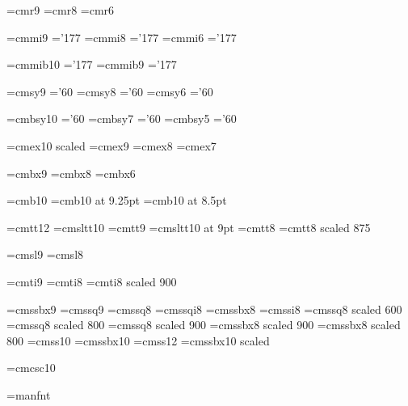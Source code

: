 \magnification\magstephalf
\parskip3pt
\baselineskip14pt

\font\ninerm=cmr9
\font\eightrm=cmr8
\font\sixrm=cmr6

\font\ninei=cmmi9  \skewchar\ninei='177
\font\eighti=cmmi8  \skewchar\eighti='177
\font\sixi=cmmi6  \skewchar\sixi='177

\font\tenbi=cmmib10  \skewchar\tenbi='177
\font\ninebi=cmmib9  \skewchar\ninebi='177

\font\ninesy=cmsy9  \skewchar\ninesy='60
\font\eightsy=cmsy8  \skewchar\eightsy='60
\font\sixsy=cmsy6  \skewchar\sixsy='60

\font\tenbsy=cmbsy10  \skewchar\tenbsy='60
\font\sevenbsy=cmbsy7  \skewchar\sevenbsy='60
\font\fivebsy=cmbsy5  \skewchar\fivebsy='60

\font\elevenex=cmex10 scaled\magstephalf
\font\nineex=cmex9
\font\eightex=cmex8
\font\sevenex=cmex7

\font\ninebf=cmbx9
\font\eightbf=cmbx8
\font\sixbf=cmbx6

\font\tenthinbf=cmb10
\font\ninethinbf=cmb10 at 9.25pt
\font\eightthinbf=cmb10 at 8.5pt

\font\twelvett=cmtt12  \hyphenchar{}  %
\font\tensltt=cmsltt10  \hyphenchar{}
\font\ninett=cmtt9  \hyphenchar{}
\font\ninesltt=cmsltt10 at 9pt  \hyphenchar{}
\font\eighttt=cmtt8  \hyphenchar{}
\font\seventt=cmtt8 scaled 875  \hyphenchar{}

\font\ninesl=cmsl9
\font\eightsl=cmsl8

\font\nineit=cmti9
\font\eightit=cmti8
\font\sevenit=cmti8 scaled 900

\font\ninessbx=cmssbx9
\font\niness=cmssq9
\font\eightss=cmssq8
\font\eightssi=cmssqi8
\font\eightssbx=cmssbx8
\font\eightssi=cmssi8
\font\fourss=cmssq8 scaled 600
\font\sixss=cmssq8 scaled 800
\font\sevenss=cmssq8 scaled 900
\font\sevenssbx=cmssbx8 scaled 900
\font\sixssbx=cmssbx8 scaled 800
\font\tenss=cmss10
\font\tenssbx=cmssbx10
\font\twelvess=cmss12
\font\titlefont=cmssbx10 scaled

\font\tencsc=cmcsc10

\font\manfnt=manfnt %

\def\ninepoint{\def\rm{\fam0\ninerm}%
  \textfont0=\ninerm \scriptfont0=\sixrm \scriptscriptfont0=\fiverm
  \textfont1=\ninei \scriptfont1=\sixi \scriptscriptfont1=\fivei
  \textfont2=\ninesy \scriptfont2=\sixsy \scriptscriptfont2=\fivesy
  \textfont3=\nineex \scriptfont3=\sevenex \scriptscriptfont3=\sevenex
  \def\it{\fam\itfam\nineit}%
  \textfont\itfam=\nineit
  \def\sl{\fam\slfam\let\ninett=\ninesltt\ninesl}%
  \textfont\slfam=\ninesl
  \def\bf{\fam\bffam\ninebf}%
  \textfont\bffam=\ninebf \scriptfont\bffam=\sixbf
   \scriptscriptfont\bffam=\fivebf
  \def\tt{\fam\ttfam\ninett}%
  \let\sltt=\error
  \textfont\ttfam=\ninett
  \def\oldstyle{\fam\@ne\ninei}%
  \normalbaselineskip=11pt\rm}

